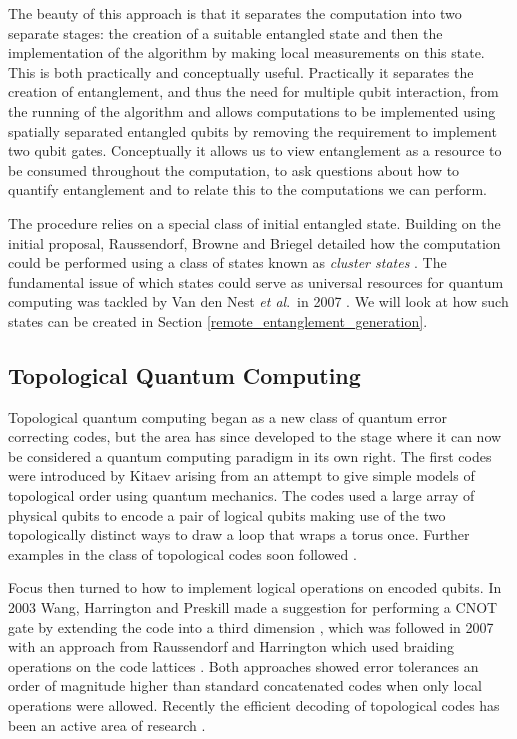 The beauty of this approach is that it separates the computation into two separate stages: the creation of a suitable entangled state and then the implementation of the algorithm by making local measurements on this state. This is both practically and conceptually useful. Practically it separates the creation of entanglement, and thus the need for multiple qubit interaction, from the running of the algorithm and allows computations to be implemented using spatially separated entangled qubits by removing the requirement to implement two qubit gates. Conceptually it allows us to view entanglement as a resource to be consumed throughout the computation, to ask questions about how to quantify entanglement and to relate this to the computations we can perform.

The procedure relies on a special class of initial entangled state. Building on the initial proposal, Raussendorf, Browne and Briegel detailed how the computation could be performed using a class of states known as \textit{cluster states} \cite{mbqc_cluster_03}. The fundamental issue of which states could serve as universal resources for quantum computing was tackled by Van den Nest \textit{et al}.\ in 2007 \cite{which_states_universal_resources}. We will look at how such states can be created in Section \ref{remote_entanglement_generation}.

\subsection{Topological Quantum Computing}

Topological quantum computing began as a new class of quantum error correcting codes, but the area has since developed to the stage where it can now be considered a quantum computing paradigm in its own right. The first codes were introduced by Kitaev \cite{kitaev_1, kitaev_2} arising from an attempt to give simple models of topological order using quantum mechanics. The codes used a large array of physical qubits to encode a pair of logical qubits making use of the two topologically distinct ways to draw a loop that wraps a torus once. Further examples in the class of topological codes soon followed \cite{kitaev_bravyi, planar_codes_freedman_meyer}.

Focus then turned to how to implement logical operations on encoded qubits. In 2003 Wang, Harrington and Preskill made a suggestion for performing a CNOT gate by extending the code into a third dimension \cite{planar_cnot_preskill}, which was followed in 2007 with an approach from Raussendorf and Harrington which used braiding operations on the code lattices \cite{raussendorf07, raussendorf07_2}. Both approaches showed error tolerances an order of magnitude higher than standard concatenated codes when only local operations were allowed. Recently the efficient decoding of topological codes has been an active area of research \cite{fowler_matching_12, poulin_renormalisation, poulin_renormalisation2, wooton_mcmc1}.

